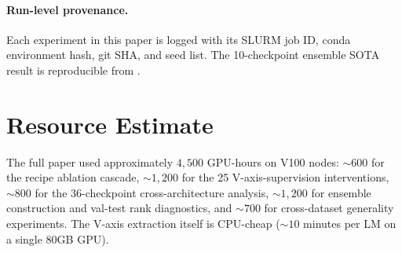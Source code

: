 \paragraph{Run-level provenance.} Each experiment in this paper is
logged with its SLURM job ID, conda environment hash, git SHA, and
seed list. The 10-checkpoint ensemble SOTA result is reproducible from
.


\section{Resource Estimate}
\label{app:compute}

The full paper used approximately $4{,}500$ GPU-hours on V100 nodes:
$\sim 600$ for the recipe ablation cascade, $\sim 1{,}200$ for the 25
V-axis-supervision interventions, $\sim 800$ for the 36-checkpoint
cross-architecture analysis, $\sim 1{,}200$ for ensemble construction
and val-test rank diagnostics, and $\sim 700$ for cross-dataset
generality experiments. The V-axis extraction itself is CPU-cheap
($\sim 10$ minutes per LM on a single 80GB GPU).

